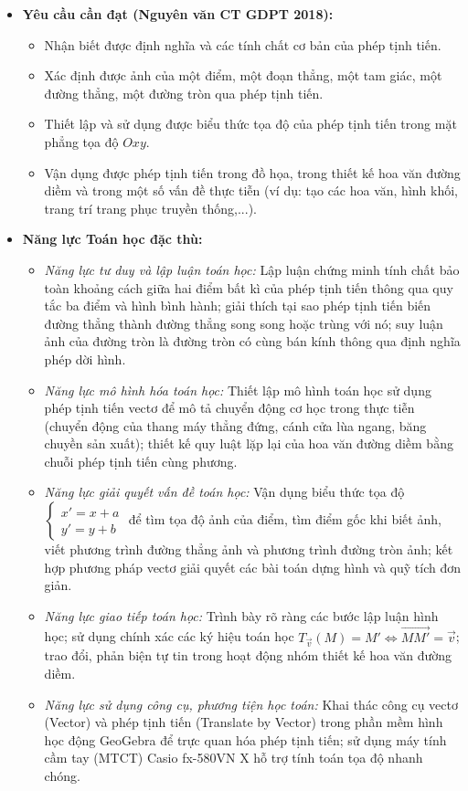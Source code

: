 \documentclass[12pt, a4paper]{article}
\renewcommand{\vec}[1]{\overrightarrow{#1}}
\begin{document}
\begin{itemize}[leftmargin=1.2cm]  
    \item \textbf{Yêu cầu cần đạt (Nguyên văn CT GDPT 2018):}  
    \begin{itemize}[leftmargin=0.6cm]  
        \item Nhận biết được định nghĩa và các tính chất cơ bản của phép tịnh tiến.  
        \item Xác định được ảnh của một điểm, một đoạn thẳng, một tam giác, một đường thẳng, một đường tròn qua phép tịnh tiến.  
        \item Thiết lập và sử dụng được biểu thức tọa độ của phép tịnh tiến trong mặt phẳng tọa độ $Oxy$.  
        \item Vận dụng được phép tịnh tiến trong đồ họa, trong thiết kế hoa văn đường diềm và trong một số vấn đề thực tiễn (ví dụ: tạo các hoa văn, hình khối, trang trí trang phục truyền thống,...).  
    \end{itemize}  
  
    \item \textbf{Năng lực Toán học đặc thù:}  
    \begin{itemize}[leftmargin=0.6cm]  
        \item \textit{Năng lực tư duy và lập luận toán học:} Lập luận chứng minh tính chất bảo toàn khoảng cách giữa hai điểm bất kì của phép tịnh tiến thông qua quy tắc ba điểm và hình bình hành; giải thích tại sao phép tịnh tiến biến đường thẳng thành đường thẳng song song hoặc trùng với nó; suy luận ảnh của đường tròn là đường tròn có cùng bán kính thông qua định nghĩa phép dời hình.  
        \item \textit{Năng lực mô hình hóa toán học:} Thiết lập mô hình toán học sử dụng phép tịnh tiến vectơ để mô tả chuyển động cơ học trong thực tiễn (chuyển động của thang máy thẳng đứng, cánh cửa lùa ngang, băng chuyền sản xuất); thiết kế quy luật lặp lại của hoa văn đường diềm bằng chuỗi phép tịnh tiến cùng phương.  
        \item \textit{Năng lực giải quyết vấn đề toán học:} Vận dụng biểu thức tọa độ $\begin{cases} x' = x + a \\ y' = y + b \end{cases}$ để tìm tọa độ ảnh của điểm, tìm điểm gốc khi biết ảnh, viết phương trình đường thẳng ảnh và phương trình đường tròn ảnh; kết hợp phương pháp vectơ giải quyết các bài toán dựng hình và quỹ tích đơn giản.  
        \item \textit{Năng lực giao tiếp toán học:} Trình bày rõ ràng các bước lập luận hình học; sử dụng chính xác các ký hiệu toán học $T_{\vec{v}}(M) = M' \iff \vec{MM'} = \vec{v}$; trao đổi, phản biện tự tin trong hoạt động nhóm thiết kế hoa văn đường diềm.  
        \item \textit{Năng lực sử dụng công cụ, phương tiện học toán:} Khai thác công cụ vectơ (Vector) và phép tịnh tiến (Translate by Vector) trong phần mềm hình học động GeoGebra để trực quan hóa phép tịnh tiến; sử dụng máy tính cầm tay (MTCT) Casio fx-580VN X hỗ trợ tính toán tọa độ nhanh chóng.  
    \end{itemize}  
  

\end{itemize}
\end{document}
